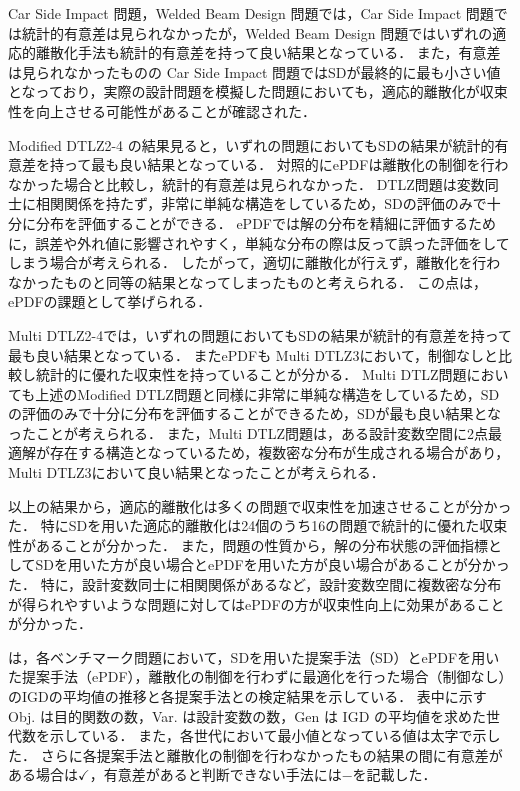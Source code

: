 \documentclass[../main/main]{subfiles}
\begin{document}
Car Side Impact 問題，Welded Beam Design 問題では，Car Side Impact 問題では統計的有意差は見られなかったが，Welded Beam Design 問題ではいずれの適応的離散化手法も統計的有意差を持って良い結果となっている．
また，有意差は見られなかったものの Car Side Impact 問題ではSDが最終的に最も小さい値となっており，実際の設計問題を模擬した問題においても，適応的離散化が収束性を向上させる可能性があることが確認された．

Modified DTLZ2-4 の結果見ると，いずれの問題においてもSDの結果が統計的有意差を持って最も良い結果となっている．
対照的にePDFは離散化の制御を行わなかった場合と比較し，統計的有意差は見られなかった．
DTLZ問題は変数同士に相関関係を持たず，非常に単純な構造をしているため，SDの評価のみで十分に分布を評価することができる．
ePDFでは解の分布を精細に評価するために，誤差や外れ値に影響されやすく，単純な分布の際は反って誤った評価をしてしまう場合が考えられる．
したがって，適切に離散化が行えず，離散化を行わなかったものと同等の結果となってしまったものと考えられる．
この点は，ePDFの課題として挙げられる．

Multi DTLZ2-4では，いずれの問題においてもSDの結果が統計的有意差を持って最も良い結果となっている．
またePDFも Multi DTLZ3において，制御なしと比較し統計的に優れた収束性を持っていることが分かる．
Multi DTLZ問題においても上述のModified DTLZ問題と同様に非常に単純な構造をしているため，SDの評価のみで十分に分布を評価することができるため，SDが最も良い結果となったことが考えられる．
また，Multi DTLZ問題は，ある設計変数空間に2点最適解が存在する構造となっているため，複数密な分布が生成される場合があり，Multi DTLZ3において良い結果となったことが考えられる．

以上の結果から，適応的離散化は多くの問題で収束性を加速させることが分かった．
特にSDを用いた適応的離散化は24個のうち16の問題で統計的に優れた収束性があることが分かった．
また，問題の性質から，解の分布状態の評価指標としてSDを用いた方が良い場合とePDFを用いた方が良い場合があることが分かった．
特に，設計変数同士に相関関係があるなど，設計変数空間に複数密な分布が得られやすいような問題に対してはePDFの方が収束性向上に効果があることが分かった．


\quad {}は，各ベンチマーク問題において，SDを用いた提案手法（SD）とePDFを用いた提案手法（ePDF），離散化の制御を行わずに最適化を行った場合（制御なし）のIGDの平均値の推移と各提案手法との検定結果を示している．
表中に示す Obj. は目的関数の数，Var. は設計変数の数，Gen は IGD の平均値を求めた世代数を示している．
また，各世代において最小値となっている値は太字で示した．
さらに各提案手法と離散化の制御を行わなかったもの結果の間に有意差がある場合は$\checkmark$，有意差があると判断できない手法には$-$を記載した．
\end{document}

